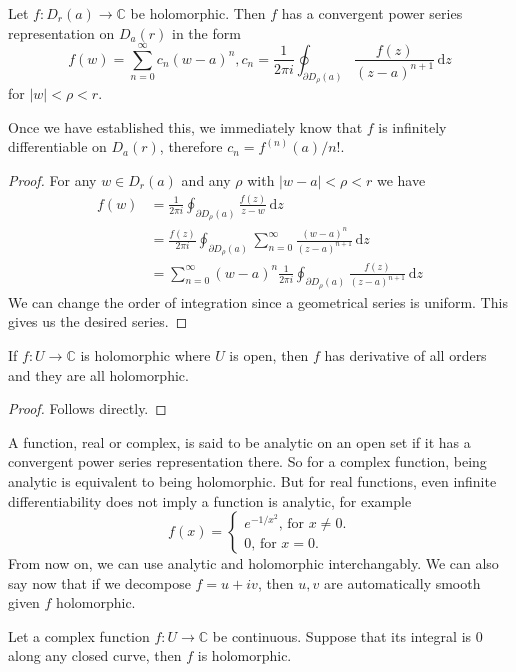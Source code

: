 \begin{theorem}
    Let $f:D_r(a)\to\mathbb C$ be holomorphic.
    Then $f$ has a convergent power series representation on $D_a(r)$ in the form
    $$f(w)=\sum_{n=0}^\infty c_n(w-a)^n,c_n=\frac{1}{2\pi i}\oint_{\partial D_\rho(a)}\frac{f(z)}{(z-a)^{n+1}}\,\mathrm dz$$
    for $|w|<\rho<r$.
\end{theorem}
Once we have established this, we immediately know that $f$ is infinitely differentiable on $D_a(r)$, therefore $c_n=f^{(n)}(a)/n!$.
\begin{proof}
    For any $w\in D_r(a)$ and any $\rho$ with $|w-a|<\rho<r$ we have
    \begin{align*}
        f(w)&=\frac{1}{2\pi i}\oint_{\partial D_\rho(a)}\frac{f(z)}{z-w}\,\mathrm dz\\
        &=\frac{f(z)}{2\pi i}\oint_{\partial D_\rho(a)}\sum_{n=0}^\infty\frac{(w-a)^n}{(z-a)^{n+1}}\,\mathrm dz\\
        &=\sum_{n=0}^\infty(w-a)^n\frac{1}{2\pi i}\oint_{\partial D_\rho(a)}\frac{f(z)}{(z-a)^{n+1}}\,\mathrm dz
    \end{align*}
    We can change the order of integration since a geometrical series is uniform.
    This gives us the desired series.
\end{proof}
\begin{corollary}
    If $f:U\to\mathbb C$ is holomorphic where $U$ is open, then $f$ has derivative of all orders and they are all holomorphic.
\end{corollary}
\begin{proof}
    Follows directly.
\end{proof}
A function, real or complex, is said to be analytic on an open set if it has a convergent power series representation there.
So for a complex function, being analytic is equivalent to being holomorphic.
But for real functions, even infinite differentiability does not imply a function is analytic, for example
$$f(x)=\begin{cases}
    e^{-1/x^2}\text{, for $x\neq 0$.}\\
    0\text{, for $x=0$.}
\end{cases}$$
From now on, we can use analytic and holomorphic interchangably.
We can also say now that if we decompose $f=u+iv$, then $u,v$ are automatically smooth given $f$ holomorphic.
\begin{theorem}
    Let a complex function $f:U\to\mathbb C$ be continuous.
    Suppose that its integral is $0$ along any closed curve, then $f$ is holomorphic.
\end{theorem}
